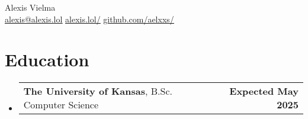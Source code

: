 \documentclass[letter,11pt]{article}
\makeatletter
\newcommand{\resumeSubheading}[3]{
	\vspace{-2pt}\item
	\begin{tabular*}{1.0\textwidth}[t]{l@{\extracolsep{\fill}}r}
		\textbf{#1}, {\small #2} & \textbf{\small #3} \\
	\end{tabular*}\vspace{-7pt}
}
\newcommand{\resumeSubHeadingListStart}{\begin{itemize}[leftmargin=0.0in, label={}]}
\newcommand{\resumeSubHeadingListEnd}{\end{itemize}}
\makeatother
\begin{document}
\begin{center}
    {\huge Alexis Vielma} \\
    \vspace{5pt}
    \href{mailto:alexis@alexis.lol}{\underline{alexis@alexis.lol}} \hspace{10pt}
    \href{https://alexis.lol/}{\underline{alexis.lol/}} \hspace{10pt}
    \href{https://github.com/aelxxs/}{\underline{github.com/aelxxs/}}
    \vspace{-10pt}
\end{center}

\section{Education}
	\resumeSubHeadingListStart
		\resumeSubheading{The University of Kansas}{B.Sc. Computer Science}{Expected May 2025}
	\resumeSubHeadingListEnd

\end{document}
